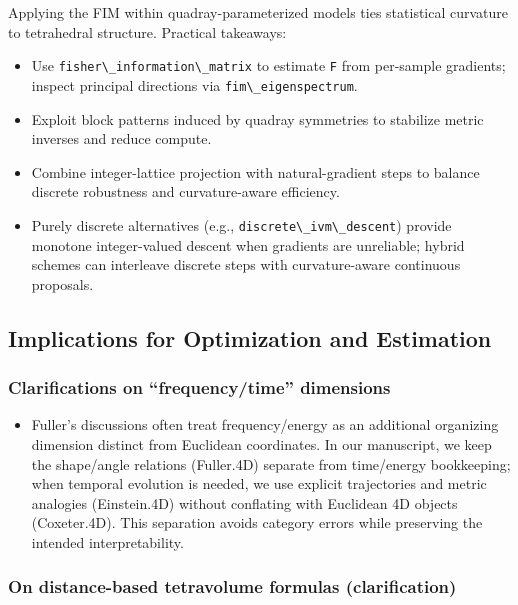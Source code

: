 \documentclass[
  10pt,
]{article}
\newcommand{\passthrough}[1]{#1}
\providecommand{\tightlist}{%
  \setlength{\itemsep}{0pt}\setlength{\parskip}{0pt}}
\begin{document}
Applying the FIM within quadray-parameterized models ties statistical
curvature to tetrahedral structure. Practical takeaways:

\begin{itemize}
\tightlist
\item
  Use \passthrough{\lstinline!fisher\_information\_matrix!} to estimate
  \passthrough{\lstinline!F!} from per-sample gradients; inspect
  principal directions via \passthrough{\lstinline!fim\_eigenspectrum!}.
\item
  Exploit block patterns induced by quadray symmetries to stabilize
  metric inverses and reduce compute.
\item
  Combine integer-lattice projection with natural-gradient steps to
  balance discrete robustness and curvature-aware efficiency.
\item
  Purely discrete alternatives (e.g.,
  \passthrough{\lstinline!discrete\_ivm\_descent!}) provide monotone
  integer-valued descent when gradients are unreliable; hybrid schemes
  can interleave discrete steps with curvature-aware continuous
  proposals.
\end{itemize}

\subsection{Implications for Optimization and
Estimation}\label{implications-for-optimization-and-estimation}

\subsubsection{Clarifications on ``frequency/time''
dimensions}\label{clarifications-on-frequencytime-dimensions}

\begin{itemize}
\tightlist
\item
  Fuller's discussions often treat frequency/energy as an additional
  organizing dimension distinct from Euclidean coordinates. In our
  manuscript, we keep the shape/angle relations (Fuller.4D) separate
  from time/energy bookkeeping; when temporal evolution is needed, we
  use explicit trajectories and metric analogies (Einstein.4D) without
  conflating with Euclidean 4D objects (Coxeter.4D). This separation
  avoids category errors while preserving the intended interpretability.
\end{itemize}

\subsubsection{On distance-based tetravolume formulas
(clarification)}\label{on-distance-based-tetravolume-formulas-clarification}
\end{document}
